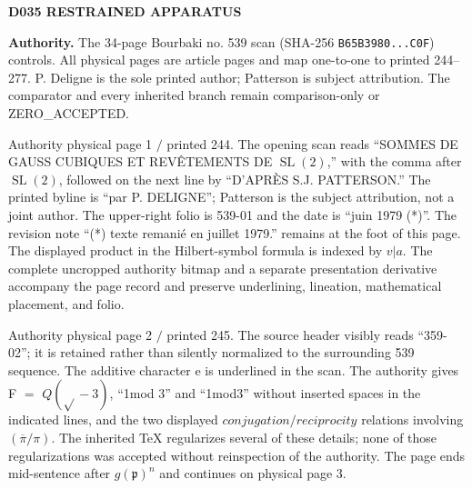 \documentclass[10pt,a4paper]{article}
\begin{document}
\fontsize{9.15pt}{8.45pt}\selectfont


\label{d035-physical-001}
\begin{center}{\Large\bfseries D035 RESTRAINED APPARATUS}\par{}\end{center}\medskip
\noindent\textbf{Authority.} The 34-page Bourbaki no. 539 scan (SHA-256 \texttt{B65B3980...C0F}) controls. All physical pages are article pages and map one-to-one to printed 244--277. P. Deligne is the sole printed author; Patterson is subject attribution. The comparator and every inherited branch remain comparison-only or ZERO\_ACCEPTED.
\par Authority physical page 1 $/$ printed 244. The opening scan reads ``SOMMES DE GAUSS CUBIQUES ET REVÊTEMENTS DE $\operatorname{SL}(2)$,'' with the comma after $\operatorname{SL}(2)$, followed on the next line by ``D'APRÈS S.J. PATTERSON.'' The printed byline is ``par P. DELIGNE''; Patterson is the subject attribution, not a joint author. The upper-right folio is 539-01 and the date is ``juin 1979 (*)''. The revision note ``(*) texte remanié en juillet 1979.'' remains at the foot of this page. The displayed product in the Hilbert-symbol formula is indexed by $v|a$. The complete uncropped authority bitmap and a separate presentation derivative accompany the page record and preserve underlining, lineation, mathematical placement, and folio.\par

\clearpage
{}
\label{d035-physical-002}
\par Authority physical page 2 $/$ printed 245. The source header visibly reads ``359-02''; it is retained rather than silently normalized to the surrounding 539 sequence. The additive character e is underlined in the scan. The authority gives F $=$ $Q(\sqrt{}-3)$, ``1mod 3'' and ``1mod3'' without inserted spaces in the indicated lines, and the two displayed $conjugation/reciprocity$ relations involving $(\overline{\pi{}}/\pi{})$. The inherited TeX regularizes several of these details; none of those regularizations was accepted without reinspection of the authority. The page ends mid-sentence after $g(\mathfrak{p})^n$ and continues on physical page 3.\par
\end{document}
